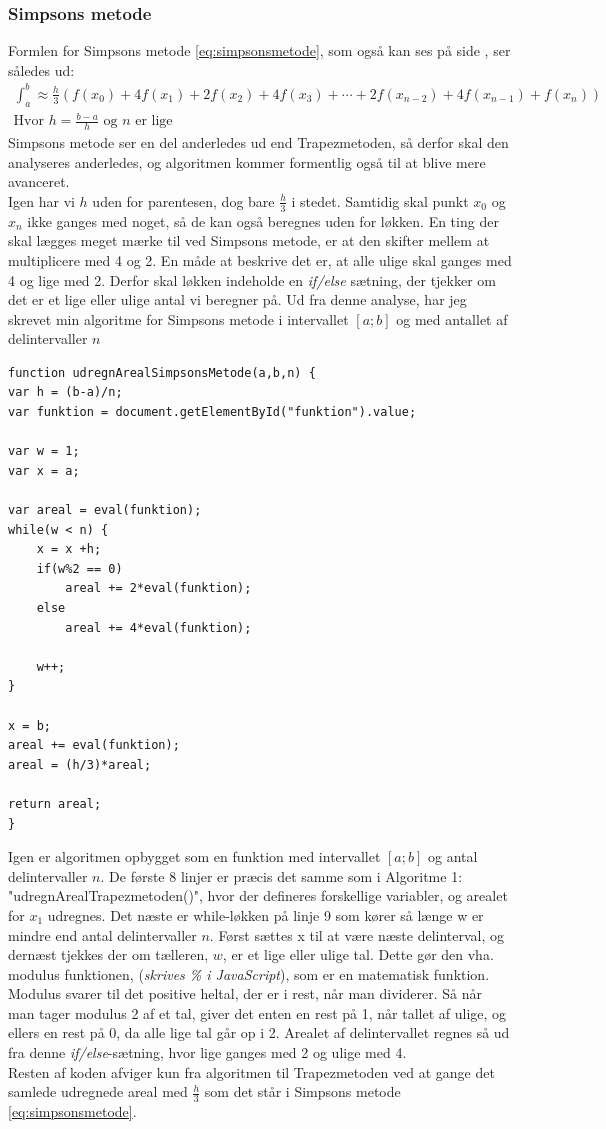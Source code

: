 \documentclass[12pt]{article}
\numberwithin{equation}{section}
\begin{document}
\subsubsection{Simpsons metode}
Formlen for Simpsons metode \eqref{eq:simpsonsmetode}, som også kan ses på side \pageref{eq:simpsonsmetode}, ser således ud:
\begin{align}
\int_{a}^{b} \approx \frac{h}{3}(f(x_0) + 4f(x_1) + 2f(x_2) + 4f(x_3) + \cdots + 2f(x_{n-2}) + 4f(x_{n-1}) + f(x_n) ) \nonumber
\\ \text{Hvor } h=\frac{b-a}{h} \text{ og $n$ er lige} \nonumber
\end{align}
Simpsons metode ser en del anderledes ud end Trapezmetoden, så derfor skal den analyseres anderledes, og algoritmen kommer formentlig også til at blive mere avanceret.\\
Igen har vi $h$ uden for parentesen, dog bare $\frac{h}{3}$ i stedet. Samtidig skal punkt $x_0$ og $x_n$ ikke ganges med noget, så de kan også beregnes uden for løkken. En ting der skal lægges meget mærke til ved Simpsons metode, er at den skifter mellem at multiplicere med 4 og 2. En måde at beskrive det er, at alle ulige skal ganges med 4 og lige med 2. Derfor skal løkken indeholde en \emph{if/else} sætning, der tjekker om det er et lige eller ulige antal vi beregner på. Ud fra denne analyse, har jeg skrevet min algoritme for Simpsons metode i intervallet $[a;b]$ og med antallet af delintervaller $n$

\begin{lstlisting}[caption="udregnArealSimpsonsMetode()"]
function udregnArealSimpsonsMetode(a,b,n) {
var h = (b-a)/n;
var funktion = document.getElementById("funktion").value;

var w = 1;
var x = a;

var areal = eval(funktion);
while(w < n) {
	x = x +h;
	if(w%2 == 0)
		areal += 2*eval(funktion);
	else
		areal += 4*eval(funktion);
	
	w++;
}

x = b;
areal += eval(funktion);
areal = (h/3)*areal;

return areal;
}
\end{lstlisting}

Igen er algoritmen opbygget som en funktion med intervallet $[a;b]$ og antal delintervaller $n$. De første 8 linjer er præcis det samme som i Algoritme 1: "udregnArealTrapezmetoden()", hvor der defineres forskellige variabler, og arealet for $x_1$ udregnes. Det næste er while-løkken på linje 9 som kører så længe w er mindre end antal delintervaller $n$. Først sættes x til at være næste delinterval, og dernæst tjekkes der om tælleren, $w$, er et lige eller ulige tal. Dette gør den vha. modulus funktionen, (\emph{skrives \% i JavaScript}), som er en matematisk funktion. Modulus svarer til det positive heltal, der er i rest, når man dividerer. Så når man tager modulus 2 af et tal, giver det enten en rest på 1, når tallet af ulige, og ellers en rest på 0, da alle lige tal går op i 2. Arealet af delintervallet regnes så ud fra denne \emph{if/else}-sætning, hvor lige ganges med 2 og ulige med 4.
\\Resten af koden afviger kun fra algoritmen til Trapezmetoden ved at gange det samlede udregnede areal med $\frac{h}{3}$ som det står i Simpsons metode \eqref{eq:simpsonsmetode}.
\end{document}
